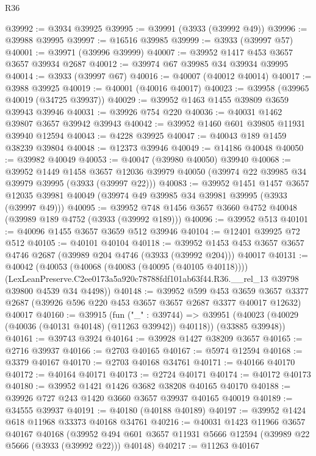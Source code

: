 \begin{lexlean}{R36}
\begin{coremodule}
@39992 := @3934 @39925
@39995 := @39991 (@3933 (@39992 @49))
@39996 := @39988 @39995
@39997 := @16516 @39985
@39999 := @3933 (@39997 @57)
@40001 := @39971 (@39996 @39999)
@40007 := @39952 @1417 @453 @3657 @3657 @39934 @2687
@40012 := @39974 @67 @39985 @34 @39934 @39995
@40014 := @3933 (@39997 @67)
@40016 := @40007 (@40012 @40014)
@40017 := @3988 @39925
@40019 := @40001 (@40016 @40017)
@40023 := @39958 (@39965 @40019 (@34725 @39937))
@40029 := @39952 @1463 @1455 @39809 @3659 @39943 @39946
@40031 := @39926 @754 @220
@40036 := @40031 @1462 @39807 @3657 @39942 @39943
@40042 := @39952 @1460 @601 @39805 @11931 @39940 @12594
@40043 := @4228 @39925
@40047 := @40043 @189 @1459 @38239 @39804
@40048 := @12373 @39946
@40049 := @14186 @40048
@40050 := @39982 @40049
@40053 := @40047 (@39980 @40050) @39940
@40068 := @39952
    @1449
    @1458
    @3657
    @12036
    @39979
    @40050
    (@39974 @22 @39985 @34 @39979 @39995 (@3933 (@39997 @22)))
@40083 := @39952
    @1451
    @1457
    @3657
    @12035
    @39981
    @40049
    (@39974 @49 @39985 @34 @39981 @39995 (@3933 (@39997 @49)))
@40095 := @39952 @748 @1456 @3657 @3660 @4752 @40048 (@39989 @189 @4752 (@3933 (@39992 @189)))
@40096 := @39952 @513
@40101 := @40096 @1455 @3657 @3659 @512 @39946
@40104 := @12401 @39925 @72 @512
@40105 := @40101 @40104
@40118 := @39952 @1453 @453 @3657 @3657 @4746 @2687 (@39989 @204 @4746 (@3933 (@39992 @204))) @40017
@40131 := @40042
    (@40053
      (@40068 (@40083 (@40095 (@40105 @40118))))
      (LexLeanPreserve.C2ee0173a5a920c78788fdf101ab63f44.R36.__rel_13
        @39798
        @39800
        @4539
        @34
        @4498))
@40148 := @39952
    @599
    @453
    @3659
    @3657
    @3377
    @2687
    (@39926 @596 @220 @453 @3657 @3657 @2687 @3377 @40017 @12632)
    @40017
@40160 := @39915
    (fun ("_" : @39744) =>
    @39951 (@40023 (@40029 (@40036 (@40131 @40148) (@11263 @39942)) @40118)) (@33885 @39948))
@40161 := @39743 @3924
@40164 := @39928 @1427 @38209 @3657
@40165 := @2716 @39937
@40166 := @2703 @40165
@40167 := @5974 @12594
@40168 := @3379 @40167
@40170 := @2703 @40168 @34761
@40171 := @40166 @40170
@40172 := @40164 @40171
@40173 := @2724 @40171
@40174 := @40172 @40173
@40180 := @39952 @1421 @1426 @3682 @38208 @40165 @40170
@40188 := @39926 @727 @243 @1420 @3660 @3657 @39937 @40165 @40019
@40189 := @34555 @39937
@40191 := @40180 (@40188 @40189)
@40197 := @39952 @1424 @618 @11968 @33373 @40168 @34761
@40216 := @40031
    @1423
    @11966
    @3657
    @40167
    @40168
    (@39952 @494 @601 @3657 @11931 @5666 @12594 (@39989 @22 @5666 (@3933 (@39992 @22))) @40148)
@40217 := @11263 @40167

\end{coremodule}
\end{lexlean}
